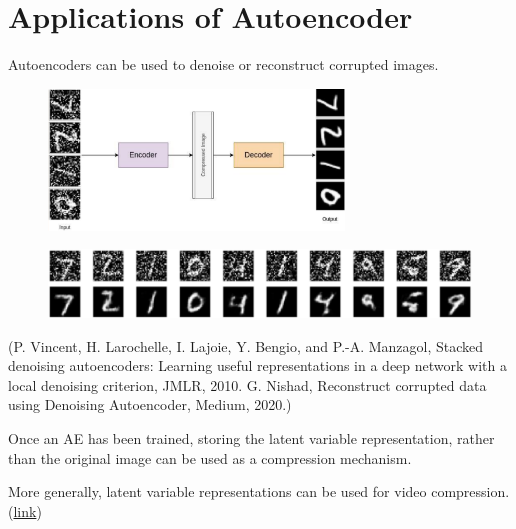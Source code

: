 \documentclass{report}
\begin{document}
\section{Applications of Autoencoder}

\begin{concept}[9.4][Applications of AE]
    Autoencoders can be used to denoise or reconstruct corrupted images.

    \begin{figure}[H]
        \centering
        \includegraphics[width=0.7\textwidth]{.././assets/9.2.png}
    \end{figure}

    \begin{figure}[H]
        \centering
        \includegraphics[width=1.0\textwidth]{.././assets/9.3.png}
    \end{figure}

    (P. Vincent, H. Larochelle, I. Lajoie, Y. Bengio, and P.-A. Manzagol, Stacked denoising autoencoders: Learning useful representations in a deep network with a local denoising criterion, JMLR, 2010.
    G. Nishad, Reconstruct corrupted data using Denoising Autoencoder, Medium, 2020.)
\end{concept}

\begin{concept}[9.5][Applications of AE]
    Once an AE has been trained, storing the latent variable representation, rather than the original image can be used as a compression mechanism.

    More generally, latent variable representations can be used for video compression.
    (\href{https://youtu.be/NqmMnjJ6GEg}{link})
\end{concept}
\end{document}
